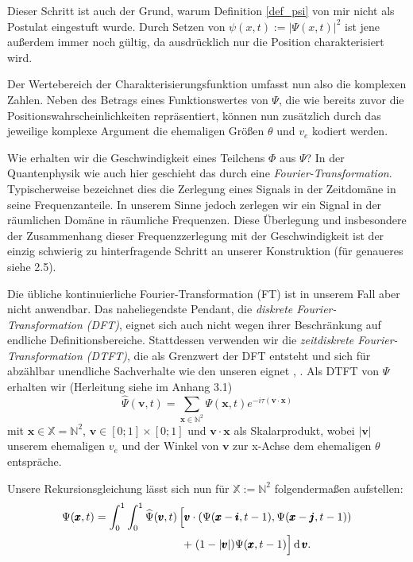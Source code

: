 \documentclass[a4paper,12pt,ngerman]{scrartcl}
\theoremstyle{plain}
\theoremstyle{plain}
\theoremstyle{plain}
\theoremstyle{plain}
\newcommand{\X}{\mathbb{X}}
\newcommand{\N}{\mathbb{N}}
\begin{document}
Dieser Schritt ist auch der Grund, warum Definition \ref{def_psi} von mir nicht als Postulat eingestuft wurde. Durch Setzen von $\psi(x,t):=|\Psi(x,t)|^2$ ist jene außerdem immer noch gültig, da ausdrücklich nur die Position charakterisiert wird.

Der Wertebereich der Charakterisierungsfunktion umfasst nun also die komplexen Zahlen. Neben des Betrags eines Funktionswertes von $\Psi$, die wie bereits zuvor die Positionswahrscheinlichkeiten repräsentiert, können nun zusätzlich durch das jeweilige komplexe Argument die ehemaligen Größen $\theta$ und $v_e$ kodiert werden.

Wie erhalten wir die Geschwindigkeit eines Teilchens $\Phi$ aus $\Psi$? In der Quantenphysik wie auch hier geschieht das durch eine \textit{Fourier-Transformation}. Typischerweise bezeichnet dies die Zerlegung eines Signals in der Zeitdomäne in seine Frequenzanteile. In unserem Sinne jedoch zerlegen wir ein Signal in der räumlichen Domäne in \glqq räumliche Frequenzen\grqq. Diese Überlegung und insbesondere der Zusammenhang dieser Frequenzzerlegung mit der Geschwindigkeit ist der einzig schwierig zu hinterfragende Schritt an unserer Konstruktion (für genaueres siehe 2.5).

Die übliche kontinuierliche Fourier-Transformation (FT) ist in unserem Fall aber nicht anwendbar. Das naheliegendste Pendant, die \textit{diskrete Fourier-Transformation (DFT)}, eignet sich auch nicht wegen ihrer Beschränkung auf endliche Definitionsbereiche. Stattdessen verwenden wir die \textit{zeitdiskrete Fourier-Transformation (DTFT)}, die als Grenzwert der DFT entsteht und sich für abzählbar unendliche Sachverhalte wie den unseren eignet \cite{wiki:dft}, \cite{wiki:dtft}. Als DTFT von $\Psi$ erhalten wir (Herleitung siehe im Anhang 3.1) 
\[\widehat{\Psi}(\pmb{v},t) = \sum_{\pmb{x}\in\mathbb{N}^2}\Psi(\pmb{x},t)e^{-i\tau(\pmb{v}\cdot\pmb{x})}\]
mit $\pmb{x}\in\X=\N^2$,\; $\pmb{v}\in[0;1]\times[0;1]$ und $\pmb{v}\cdot\pmb{x}$ als Skalarprodukt, wobei $|\pmb{v}|$ unserem ehemaligen $v_e$ und der Winkel von $\pmb{v}$ zur x-Achse dem ehemaligen $\theta$ entspräche.

Unsere Rekursionsgleichung lässt sich nun für $\X:=\N^2$ folgendermaßen aufstellen:
\begin{align*}
\Psi(\pmb{x},t) = \int_0^{1}\int_0^{1} 
\widehat{\Psi}(\pmb{v},t)
&\left[\vphantom{\hat{\Psi}}
\pmb{v}\cdot\left(\Psi(\pmb{x}-\pmb{i},t-1),\Psi(\pmb{x}-\pmb{j},t-1)\right)
\right.\\
&\left.\;+\;(1-|\pmb{v}|)\Psi(\pmb{x},t-1)\vphantom{\hat{\Psi}}\right]
\operatorname{d}\pmb{v}. 
\end{align*}
\end{document}
